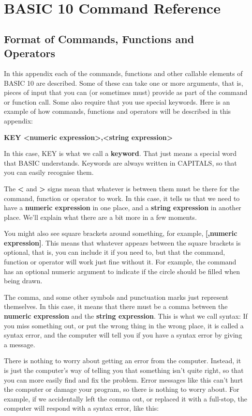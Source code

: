 \chapter{BASIC 10 Command Reference}

\section{Format of Commands, Functions and Operators}

In this appendix each of the commands, functions and other callable elements of
BASIC 10 are described.
Some of these can take one or more arguments, that is, pieces of input that you
can (or sometimes must) provide as part of the command or function call.
Some also require that you use special keywords.
Here is an example of how commands, functions and operators will be described
in this appendix:

{\bf KEY <numeric expression>,<string expression> }

In this case, KEY is what we call a {\bf keyword}. That just means a special word that BASIC
understands.  Keywords are always written in CAPITALS, so that you can easily recognise them.

The {\bf <} and {\bf >} signs mean that whatever is between them must be there for the command, function or operator to work.
In this case, it tells us that we need to have a {\bf numeric expression} in one place, and a {\bf string expression} in another place.
We'll explain what there are a bit more in a few moments.

You might also see square brackets around something, for example, {\bf [,numeric expression]}.
This means that whatever appears between the square brackets is optional, that is, you can include it if you need to, but
that the command, function or operator will work just fine without it.  For example, the  command has
an optional numeric argument to indicate if the circle should be filled when being drawn.

The comma, and some other symbols and punctuation marks just represent themselves.
In this case, it means that there must be a comma between the {\bf numeric expression} and the {\bf string expression}.
This is what we call syntax: If you miss something out, or put the wrong thing in the wrong place, it is called a
syntax error, and the computer will tell you if you have a syntax error by giving a  message.

There is nothing to worry about getting an error from the computer.
Instead, it is just the computer's way of telling you that something isn't quite right, so that you can more easily
find and fix the problem.
Error messages like this can't hurt the computer or damage your program, so there is nothing to worry about.
For example, if we accidentally left the comma out, or replaced it with a full-stop, the computer will respond with
a syntax error, like this:

